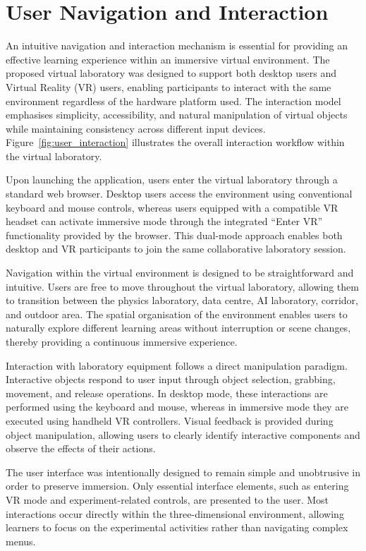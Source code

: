 \section{User Navigation and Interaction}

An intuitive navigation and interaction mechanism is essential for providing an effective learning experience within an immersive virtual environment. The proposed virtual laboratory was designed to support both desktop users and Virtual Reality (VR) users, enabling participants to interact with the same environment regardless of the hardware platform used. The interaction model emphasises simplicity, accessibility, and natural manipulation of virtual objects while maintaining consistency across different input devices. Figure~\ref{fig:user_interaction} illustrates the overall interaction workflow within the virtual laboratory.

Upon launching the application, users enter the virtual laboratory through a standard web browser. Desktop users access the environment using conventional keyboard and mouse controls, whereas users equipped with a compatible VR headset can activate immersive mode through the integrated ``Enter VR'' functionality provided by the browser. This dual-mode approach enables both desktop and VR participants to join the same collaborative laboratory session.

Navigation within the virtual environment is designed to be straightforward and intuitive. Users are free to move throughout the virtual laboratory, allowing them to transition between the physics laboratory, data centre, AI laboratory, corridor, and outdoor area. The spatial organisation of the environment enables users to naturally explore different learning areas without interruption or scene changes, thereby providing a continuous immersive experience.

Interaction with laboratory equipment follows a direct manipulation paradigm. Interactive objects respond to user input through object selection, grabbing, movement, and release operations. In desktop mode, these interactions are performed using the keyboard and mouse, whereas in immersive mode they are executed using handheld VR controllers. Visual feedback is provided during object manipulation, allowing users to clearly identify interactive components and observe the effects of their actions.

The user interface was intentionally designed to remain simple and unobtrusive in order to preserve immersion. Only essential interface elements, such as entering VR mode and experiment-related controls, are presented to the user. Most interactions occur directly within the three-dimensional environment, allowing learners to focus on the experimental activities rather than navigating complex menus.

